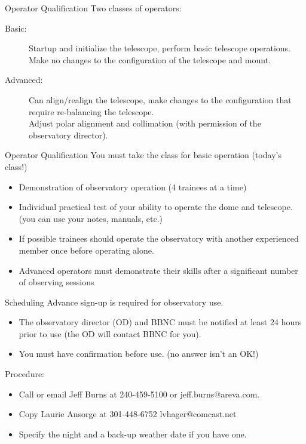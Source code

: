 
\begin{frame}{Operator Qualification}
  \Large
  Two classes of operators:
  \begin{description}
    \item[Basic:] Startup and initialize the telescope, perform basic telescope operations.
     Make no changes to the configuration of the telescope and mount.
    \item[Advanced:] Can align/realign the telescope, make changes to the configuration that require
     re-balancing the telescope. \\[1ex]
     Adjust polar alignment and collimation (with permission of the observatory director).
  \end{description}
\end{frame}


\begin{frame}{Operator Qualification}
  \Large
  You must take the class for basic operation (today's class!)
  \begin{itemize}
    \item Demonstration of observatory operation (4 trainees at a time)
    \item Individual practical test of your ability to operate the dome and telescope.
     (you can use your notes, manuals, etc.)
    \item If possible trainees should operate the observatory with another experienced
      member once before operating alone.
    \item Advanced operators must demonstrate their skills after a significant number of observing sessions
  \end{itemize}
\end{frame}


\begin{frame}{Scheduling}
  \Large
  Advance sign-up is required for observatory use.
  \begin{itemize}
    \item The observatory director (OD) and BBNC must be notified at least 24 hours prior
    to use (the OD will contact BBNC for you).
    \item You must have confirmation before use. (no answer isn't an OK!)
  \end{itemize}

  Procedure:
  \begin{itemize}
    \item Call or email Jeff Burns at 240-459-5100 or jeff.burns@areva.com.
    \item Copy Laurie Ansorge at 301-448-6752 lvhager@comcast.net
    \item Specify the night and a back-up weather date if you have one.
  \end{itemize}
\end{frame}

